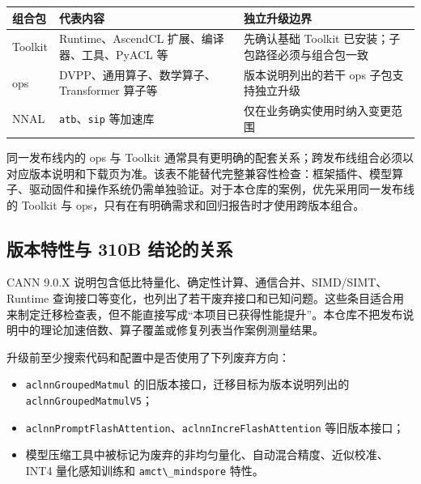 \begin{longtable}[]{@{}
  >{\raggedright\arraybackslash}p{}
  >{\raggedright\arraybackslash}p{}
  >{\raggedright\arraybackslash}p{}@{}}
\toprule\noalign{}
\begin{minipage}[b]{\linewidth}\raggedright
组合包
\end{minipage} & \begin{minipage}[b]{\linewidth}\raggedright
代表内容
\end{minipage} & \begin{minipage}[b]{\linewidth}\raggedright
独立升级边界
\end{minipage} \\
\midrule\noalign{}
\endhead
\bottomrule\noalign{}
\endlastfoot
Toolkit & Runtime、AscendCL 扩展、编译器、工具、PyACL 等 & 先确认基础
Toolkit 已安装；子包路径必须与组合包一致 \\
ops & DVPP、通用算子、数学算子、Transformer 算子等 & 版本说明列出的若干
ops 子包支持独立升级 \\
NNAL & \passthrough{\lstinline!atb!}、\passthrough{\lstinline!sip!}
等加速库 & 仅在业务确实使用时纳入变更范围 \\
\end{longtable}

同一发布线内的 ops 与 Toolkit
通常具有更明确的配套关系；跨发布线组合必须以对应版本说明和下载页为准。该表不能替代完整兼容性检查：框架插件、模型算子、驱动固件和操作系统仍需单独验证。对于本仓库的案例，优先采用同一发布线的
Toolkit 与 ops，只有在有明确需求和回归报告时才使用跨版本组合。

\subsection{版本特性与 310B
结论的关系}\label{ux7248ux672cux7279ux6027ux4e0e-310b-ux7ed3ux8bbaux7684ux5173ux7cfb}

CANN 9.0.X 说明包含低比特量化、确定性计算、通信合并、SIMD/SIMT、Runtime
查询接口等变化，也列出了若干废弃接口和已知问题。这些条目适合用来制定迁移检查表，但不能直接写成``本项目已获得性能提升''。本仓库不把发布说明中的理论加速倍数、算子覆盖或修复列表当作案例测量结果。

升级前至少搜索代码和配置中是否使用了下列废弃方向：

\begin{itemize}
\tightlist
\item
  \passthrough{\lstinline!aclnnGroupedMatmul!}
  的旧版本接口，迁移目标为版本说明列出的
  \passthrough{\lstinline!aclnnGroupedMatmulV5!}；
\item
  \passthrough{\lstinline!aclnnPromptFlashAttention!}、\passthrough{\lstinline!aclnnIncreFlashAttention!}
  等旧版本接口；
\item
  模型压缩工具中被标记为废弃的非均匀量化、自动混合精度、近似校准、INT4
  量化感知训练和 \passthrough{\lstinline!amct\_mindspore!} 特性。
\end{itemize}

